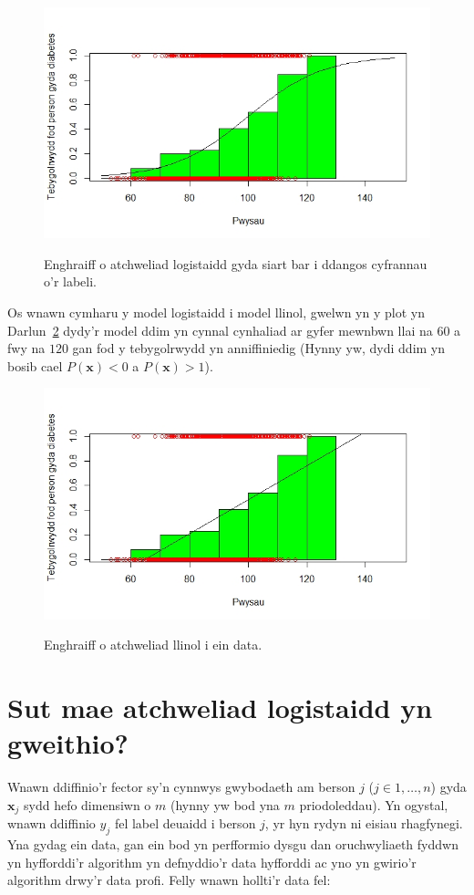 \begin{figure}[H]
\begin{center}
\includegraphics[width=0.5\linewidth]{../img/atchweliad_logistaidd_gyda_pwyntiau.jpeg}
\label{fig:Enghraifft_o_atchweliad_logistaidd_pwyntiau_gyda_siart_bar}
\caption{Enghraiff o atchweliad logistaidd gyda siart bar i ddangos cyfrannau o'r labeli.}
\end{center}
\end{figure}

Os wnawn cymharu y model logistaidd i model llinol, gwelwn yn y plot yn Darlun~\ref{fig:Enghraifft_o_atchweliad_llinol} dydy'r model ddim yn cynnal cynhaliad ar gyfer mewnbwn llai na $60$ a fwy na $120$ gan fod y tebygolrwydd yn anniffiniedig (Hynny yw, dydi ddim yn bosib cael $P(\mathbf{x})<0$ a $P(\mathbf{x})>1$). 

\begin{figure}[H]
\begin{center}
\includegraphics[width=0.5\linewidth]{../img/cymharu_llinol.jpeg}
\label{fig:Enghraifft_o_atchweliad_llinol}
\caption{Enghraiff o atchweliad llinol i ein data.}
\end{center}
\end{figure}

\section{Sut mae atchweliad logistaidd yn gweithio?}

Wnawn ddiffinio'r fector sy'n cynnwys gwybodaeth am berson $j$ ($j \in {1,\dots,n}$) gyda $\mathbf{x}_j$ sydd hefo dimensiwn o $m$ (hynny yw bod yna $m$ priodoleddau). Yn ogystal, wnawn ddiffinio $y_j$ fel label deuaidd i berson $j$, yr hyn rydyn ni eisiau rhagfynegi. Yna gydag ein data, gan ein bod yn perfformio dysgu dan oruchwyliaeth fyddwn yn hyfforddi'r algorithm yn defnyddio'r data hyfforddi ac yno yn gwirio'r algorithm drwy'r data profi. Felly wnawn hollti'r data fel:

